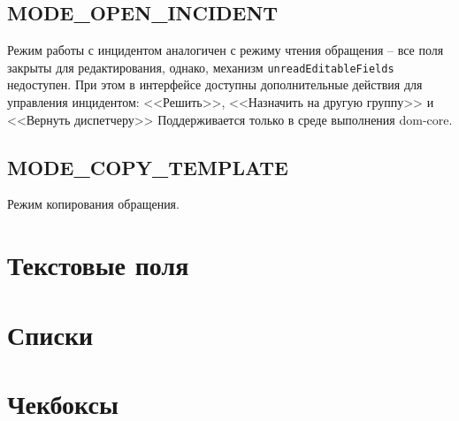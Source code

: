 \documentclass[../index.tex]{subfiles}
\begin{document}
\subsection{MODE\_OPEN\_INCIDENT}
Режим работы с инцидентом аналогичен с режиму чтения обращения -- все поля закрыты для редактирования, однако, механизм \verb|unreadEditableFields| недоступен. При этом в интерфейсе доступны дополнительные действия для управления инцидентом: <<Решить>>,  <<Назначить на другую группу>> и <<Вернуть диспетчеру>>
Поддерживается только в среде выполнения dom-core.

\subsection{MODE\_COPY\_TEMPLATE}
Режим копирования обращения.

\section{Текстовые поля}

\section{Списки}

\section{Чекбоксы}

\section{}
\end{document}
